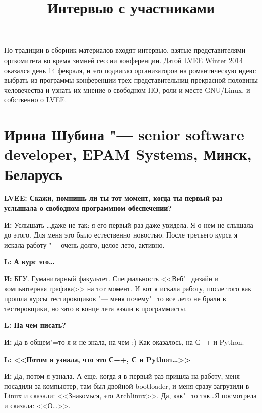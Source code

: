 \documentclass[10pt, a5paper]{article}
\begin{document}
\title{Интервью с участниками}
\date{}
\maketitle

По традиции в сборник материалов входят интервью, взятые представителями оргкомитета во время зимней сессии конференции. Датой LVEE Winter 2014 оказался день 14 февраля, и это подвигло организаторов на романтическую идею: выбрать из программы конференции трех представительниц прекрасной половины человечества и узнать их мнение о свободном ПО, роли и месте GNU/Linux, и собственно о LVEE.

\section{Ирина Шубина "--- senior software developer, EPAM Systems, Минск, Беларусь}

{\noindent \bf LVEE: Скажи, помнишь ли ты тот момент, когда ты первый раз услышала о свободном программном обеспечении?}

{\noindent \bf И:} Услышать \ldots даже не так: я его первый раз даже увидела. Я о нем не слышала до этого. Для меня это было естественно новостью. После третьего курса я искала работу "--- очень долго, целое лето, активно.

{\noindent \bf L: А курс это\ldots}

{\noindent \bf И:} БГУ. Гуманитарный факультет. Специальность <<Веб"=дизайн и компьютерная графика>> на тот момент.  И вот я искала работу, после того как прошла курсы тестировщиков "--- меня почему"=то все лето не брали в тестировщики, но зато в конце лета взяли в программисты.

{\noindent \bf L: На чем писать?}

{\noindent \bf И:} Да в общем"=то я и не знала, на чем :) Как оказалось, на С++ и Python.

{\noindent \bf L: <<Потом я узнала, что это С++, С и Python\ldots>>}

{\noindent \bf И:} Да, потом я узнала. А еще, когда я в первый раз пришла на работу, меня посадили за компьютер, там был двойной bootloader, и меня сразу загрузили в Linux и сказали: <<Знакомься, это Archlinux>>. Да, как"=то так\ldots Я посмотрела и сказала: <<О\ldots >>.
\end{document}
